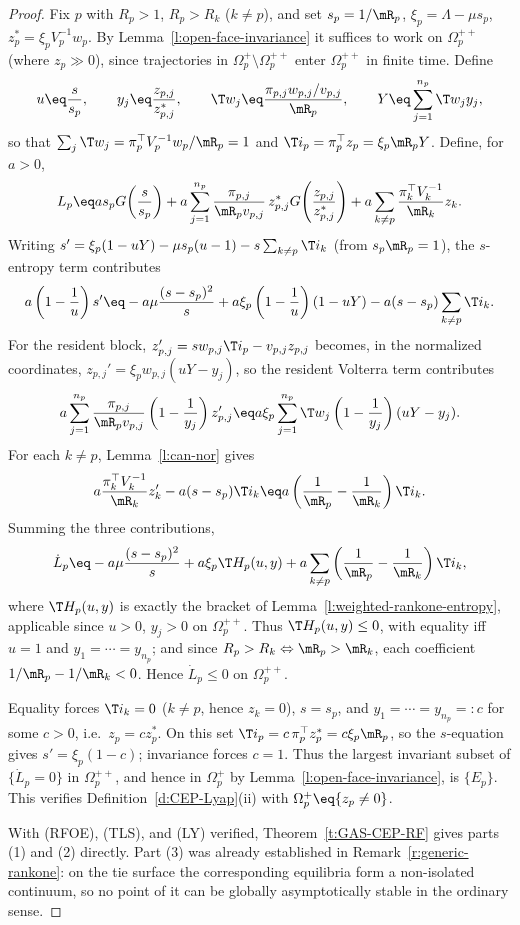 \begin{proof}
Fix $p$ with $R_p>1$, $R_p>R_k$ ($k\ne p$), and set $s_p=1/\mR_p$,
$\xi_p=\Lambda-\mu s_p$, $z_p^*=\xi_pV_p^{-1}w_p$.  By
Lemma~\ref{l:open-face-invariance} it suffices to work on
$\Omega_p^{++}$ (where $z_p\gg0$), since trajectories in
$\Omega_p^+\setminus\Omega_p^{++}$ enter $\Omega_p^{++}$ in finite
time. Define
\[
u\eq\frac{s}{s_p},
\qquad
y_j\eq\frac{z_{p,j}}{z_{p,j}^*},
\qquad
\T w_j\eq\frac{\pi_{p,j}w_{p,j}/v_{p,j}}{\mR_p},
\qquad
Y\eq\sum_{j=1}^{n_p}\T w_jy_j,
\]
so that $\sum_j\T w_j=\pi_p^\top V_p^{-1}w_p/\mR_p=1$ and
$\T i_p=\pi_p^\top z_p=\xi_p\mR_pY$.  Define, for $a>0$,
\[
L_p
\eq
a s_pG\!\left(\frac{s}{s_p}\right)
+
a\sum_{j=1}^{n_p}
\frac{\pi_{p,j}}{\mR_pv_{p,j}}\,
z_{p,j}^*
G\!\left(\frac{z_{p,j}}{z_{p,j}^*}\right)
+
a\sum_{k\ne p}
\frac{\pi_k^\top V_k^{-1}}{\mR_k}z_k.
\]
Writing $s'=\xi_p(1-uY)-\mu s_p(u-1)-s\sum_{k\ne p}\T i_k$ (from
$s_p\mR_p=1$), the $s$-entropy term contributes
\[
a\left(1-\frac1u\right)s'
\eq
-a\mu\frac{(s-s_p)^2}{s}
+a\xi_p\left(1-\frac1u\right)(1-uY)
-a(s-s_p)\sum_{k\ne p}\T i_k.
\]
For the resident block, $z_{p,j}'=sw_{p,j}\T i_p-v_{p,j}z_{p,j}$
becomes, in the normalized coordinates, $z_{p,j}'=\xi_pw_{p,j}(uY-y_j)$,
so the resident Volterra term contributes
\[
a\sum_{j=1}^{n_p}\frac{\pi_{p,j}}{\mR_pv_{p,j}}
\left(1-\frac1{y_j}\right)z_{p,j}'
\eq
a\xi_p\sum_{j=1}^{n_p}\T w_j\left(1-\frac1{y_j}\right)(uY-y_j).
\]
For each $k\ne p$, Lemma~\ref{l:can-nor} gives
\[
a\frac{\pi_k^\top V_k^{-1}}{\mR_k}z_k'-a(s-s_p)\T i_k
\eq
a\left(\frac1{\mR_p}-\frac1{\mR_k}\right)\T i_k.
\]
Summing the three contributions,
\[
\dot L_p
\eq
-a\mu\frac{(s-s_p)^2}{s}
+a\xi_p\T H_p(u,y)
+a\sum_{k\ne p}\left(\frac1{\mR_p}-\frac1{\mR_k}\right)\T i_k,
\]
where $\T H_p(u,y)$ is exactly the bracket of
Lemma~\ref{l:weighted-rankone-entropy}, applicable since $u>0$,
$y_j>0$ on $\Omega_p^{++}$.  Thus $\T H_p(u,y)\le0$, with equality
iff $u=1$ and $y_1=\cdots=y_{n_p}$; and since $R_p>R_k\Leftrightarrow
\mR_p>\mR_k$, each coefficient $1/\mR_p-1/\mR_k<0$.  Hence
$\dot L_p\le0$ on $\Omega_p^{++}$.

Equality forces $\T i_k=0$ ($k\ne p$, hence $z_k=0$), $s=s_p$, and
$y_1=\cdots=y_{n_p}=:c$ for some $c>0$, i.e.\ $z_p=cz_p^*$.  On this
set $\T i_p=c\,\pi_p^\top z_p^*=c\xi_p\mR_p$, so the $s$-equation
gives $s'=\xi_p(1-c)$; invariance forces $c=1$.  Thus the largest
invariant subset of $\{\dot L_p=0\}$ in $\Omega_p^{++}$, and hence in
$\Omega_p^+$ by Lemma~\ref{l:open-face-invariance}, is $\{E_p\}$.
This verifies Definition~\ref{d:CEP-Lyap}(ii) with
$\Omega_p^+\eq\{z_p\ne0\}$.

\smallskip
With (RFOE), (TLS), and (LY) verified, Theorem~\ref{t:GAS-CEP-RF}
gives parts (1) and (2) directly.  Part (3) was already established
in Remark~\ref{r:generic-rankone}: on the tie surface the
corresponding equilibria form a non-isolated continuum, so no point
of it can be globally asymptotically stable in the ordinary sense.
\end{proof}